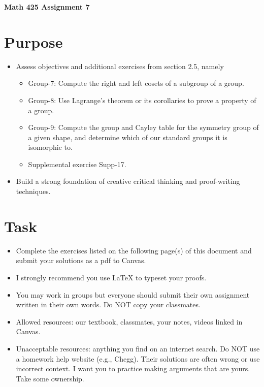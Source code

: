 \documentclass[12pt]{article}
\begin{document}
	\begin{center}
		{\Large \bf Math 425 Assignment 7}
	\end{center}
	\section*{Purpose}
	\begin{itemize}
		\item Assess objectives and additional exercises from section 2.5, namely
		\begin{itemize}
			\item Group-7:	Compute the right and left cosets of a subgroup of a group.
			\item Group-8:	Use Lagrange’s theorem or its corollaries to prove a property of a group.
			\item Group-9:	Compute the group and Cayley table for the symmetry group of a given shape, and determine which of our standard groups it is isomorphic to.
			\item Supplemental exercise Supp-17.
		\end{itemize}
		\item Build a strong foundation of creative critical thinking and proof-writing techniques.
	\end{itemize}
	\section*{Task}
	\begin{itemize}
		\item Complete the exercises listed on the following page(s) of this document and submit your solutions as a pdf to Canvas.
		\item I strongly recommend you use LaTeX to typeset your proofs.
		\item You may work in groups but everyone should submit their own assignment written in their own words.  Do NOT copy your classmates.
		\item Allowed resources: our textbook, classmates, your notes, videos linked in Canvas.
		\item Unacceptable resources: anything you find on an internet search. Do NOT use a homework help website (e.g., Chegg). Their solutions are often wrong or use incorrect context.  I want you to practice making arguments that are yours. Take some ownership.
	\end{itemize}
\end{document}
